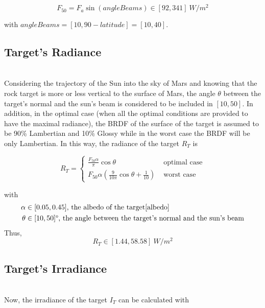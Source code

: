 \begin{equation}
F_{50} = F_a\sin(angleBeams) \in [92, 341] \ W/m^2
\end{equation}

with $angleBeams = [10, 90-latitude] = [10, 40]$\textdegree.

\subsection{Target's Radiance}
~\\
Considering the trajectory of the Sun into the sky of Mars and knowing that the rock target is more or less vertical to the surface of Mars, the angle $\theta$ between the target's normal and the sun's beam is considered to be included in $[10, 50]$\textdegree. In addition, in the optimal case (when all the optimal conditions are provided to have the maximal radiance), the BRDF of the surface of the target is assumed to be 90\% Lambertian and 10\% Glossy while in the worst case the BRDF will be only Lambertian. In this way, the radiance of the target $R_T$ is

\begin{equation}
\label{eq:Radiance Target}
R_T = \left\{
	\begin{array}{ll}
		\frac{F_{50}\alpha}{\pi}\cos \theta & \mbox{ optimal case} \\
		F_{50}\alpha(\frac{9}{10\pi}\cos\theta + \frac{1}{10}) & \mbox{ worst case}
	\end{array}
\right.
\end{equation}

with 
\begin{align*}
	\alpha & \in [0.05, 0.45]\mbox{, the albedo of the target\ref{albedo}} \\
	\theta & \in [10, 50]\mbox{\textdegree, the angle between the target's normal and the sun's beam}
\end{align*}
Thus, 
\begin{equation}
\label{eq:Radiance Target Range}
R_T \in [1.44, 58.58] \ W/m^2
\end{equation}





\subsection{Target's Irradiance}
\label{Target's Irradiance}
~\\
Now, the irradiance of the target $I_T$ can be calculated with

